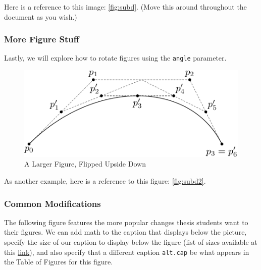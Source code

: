 \documentclass[12pt,twoside]{amherstthesis}
\begin{document}
  Here is a reference to this image: \autoref{fig:subd}. (Move this around
  throughout the document as you wish.)
  
  \subsubsection{More Figure Stuff}\label{more-figure-stuff}
  
  Lastly, we will explore how to rotate figures using the \texttt{angle}
  parameter.
  
  \begin{Shaded}
  \begin{Highlighting}[]
  \NormalTok{(}\NormalTok{, }
        \NormalTok{, }
         \NormalTok{,}
         \NormalTok{,}
         \NormalTok{)}
  \end{Highlighting}
  \end{Shaded}
  
  \begin{figure}[htbp]
  \centering
  \includegraphics[scale = 1.5,angle = 180]{figure/subdivision.pdf}
  \caption[A Larger Figure, Flipped Upside Down]{\normalsize{A Larger Figure, Flipped Upside Down}}
  \label{fig:subd2}
  \end{figure}
  
  As another example, here is a reference to this figure:
  \autoref{fig:subd2}.
  
  \subsubsection{Common Modifications}\label{common-modifications}
  
  The following figure features the more popular changes thesis students
  want to their figures. We can add math to the caption that displays
  below the picture, specify the size of our caption to display below the
  figure (list of sizes available at this
  \href{http://www.emerson.emory.edu/services/latex/latex_169.html\#SEC169}{link}),
  and also specify that a different caption \texttt{alt.cap} be what
  appears in the Table of Figures for this figure.
  
\end{document}
